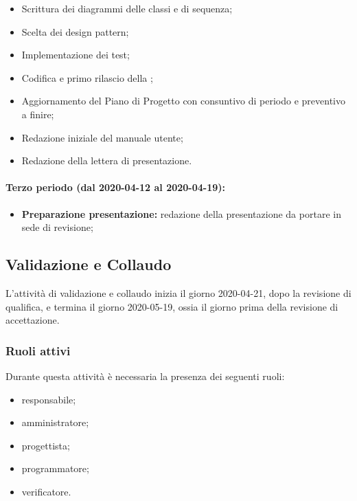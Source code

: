 					\begin{itemize}
						\item Scrittura dei diagrammi delle classi e di sequenza;
						\item Scelta dei design pattern;
						\item Implementazione dei test;
						\item Codifica e primo rilascio della ;
						\item Aggiornamento del Piano di Progetto con consuntivo di periodo e preventivo a finire;
						\item Redazione iniziale del manuale utente;
						\item Redazione della lettera di presentazione.
					\end{itemize}
		
				\paragraph{Terzo periodo (dal 2020-04-12 al 2020-04-19):}
				
					\begin{itemize}
						\item \textbf{Preparazione presentazione:} redazione della presentazione da portare in sede di revisione;
					\end{itemize}
		
		\subsection{Validazione e Collaudo}	
			
			L'attività di validazione e collaudo inizia il giorno 2020-04-21, dopo la revisione di qualifica, e termina il giorno 2020-05-19, ossia il giorno prima della revisione di accettazione.
			
			\subsubsection{Ruoli attivi}
			
			Durante questa attività è necessaria la presenza dei seguenti ruoli:
			\begin{itemize}
				\item responsabile;
				\item amministratore;
				\item progettista;
				\item programmatore;
				\item verificatore.
			\end{itemize}
			
